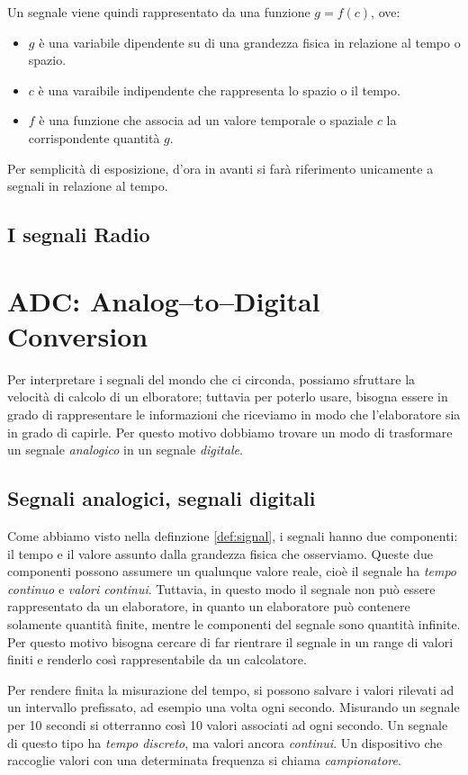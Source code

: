 \documentclass[a4paper,11pt,twoside,openright]{unibo}
\begin{document}
Un segnale viene quindi rappresentato da una funzione $g = f(c)$, ove:
\begin{itemize}
    \item $g$ \`e una variabile dipendente su di una grandezza fisica in
    relazione al tempo o spazio.
    \item $c$ \`e una varaibile indipendente che rappresenta lo spazio o il
    tempo.
    \item $f$ \`e una funzione che associa ad un valore temporale o spaziale $c$
    la corrispondente quantit\`a $g$.
\end{itemize}

Per semplicit\`a di esposizione, d'ora in avanti si far\`a riferimento
unicamente a segnali in relazione al tempo.
\subsection{I segnali Radio}
\section{ADC: Analog--to--Digital Conversion}
Per interpretare i segnali del mondo che ci circonda, possiamo sfruttare la
velocit\`a di calcolo di un elboratore; tuttavia per poterlo usare, bisogna
essere in grado di rappresentare le informazioni che riceviamo in modo che
l'elaboratore sia in grado di capirle. Per questo motivo dobbiamo trovare un
modo di trasformare un segnale \emph{analogico} in un segnale \emph{digitale}.
\subsection{Segnali analogici, segnali digitali}
Come abbiamo visto nella definzione \ref{def:signal}, i segnali hanno due
componenti: il tempo e il valore assunto dalla grandezza fisica che osserviamo.
Queste due componenti possono assumere un qualunque valore reale, cio\`e il
segnale ha \emph{tempo continuo} e \emph{valori continui}. Tuttavia, in questo
modo il segnale non pu\`o essere rappresentato da un elaboratore, in quanto un
elaboratore pu\`o contenere solamente quantit\`a finite, mentre le componenti
del segnale sono quantit\`a infinite. Per questo motivo bisogna cercare di far
rientrare il segnale in un range di valori finiti e renderlo cos\`i
rappresentabile da un calcolatore.

Per rendere finita la misurazione del tempo, si possono salvare i valori
rilevati ad un intervallo prefissato, ad esempio una volta ogni secondo.
Misurando un segnale per 10 secondi si otterranno cos\`i 10 valori associati ad
ogni secondo. Un segnale di questo tipo ha \emph{tempo discreto}, ma valori
ancora \emph{continui}. Un dispositivo che raccoglie valori con una determinata
frequenza si chiama \emph{campionatore}.
\end{document}
